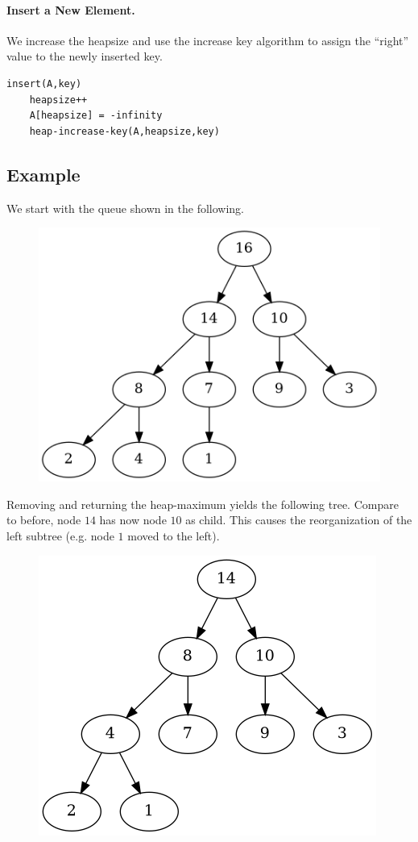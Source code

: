 \paragraph{Insert a New Element.} We increase the heapsize and use the increase key algorithm to assign the ``right'' value to the newly inserted key.

\begin{verbatim}
insert(A,key)
    heapsize++
    A[heapsize] = -infinity
    heap-increase-key(A,heapsize,key)
\end{verbatim}


\subsection{Example}

We start with the queue shown in the following.

\begin{figure}[H]
\centering
\includegraphics[scale=0.5]{images/heap_queue_01.png}
\end{figure}

Removing and returning the heap-maximum yields the following tree. Compare to before, node $14$ has now node $10$ as child. This causes the reorganization of the left subtree (e.g. node $1$ moved to the left).

\begin{figure}[H]
\centering
\includegraphics[scale=0.5]{images/heap_queue_02.png}
\end{figure}

